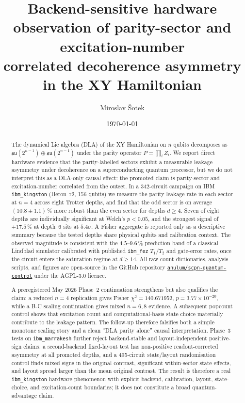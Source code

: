\documentclass[reprint,aps,physrev,superscriptaddress,floatfix,longbibliography]{revtex4-2}
\begin{document}
\title{Backend-sensitive hardware observation of parity-sector and excitation-number\\
correlated decoherence asymmetry in the XY Hamiltonian}

\author{Miroslav \v{S}otek}

\date{\today}

\begin{abstract}
The dynamical Lie algebra (DLA) of the XY Hamiltonian on $n$ qubits
decomposes as $\mathfrak{su}(2^{n-1}) \oplus \mathfrak{su}(2^{n-1})$
under the parity operator $P = \prod_i Z_i$. We report direct
hardware evidence that the parity-labelled sectors exhibit a
measurable leakage asymmetry under decoherence on a superconducting
quantum processor, but we do not interpret this as a DLA-only causal
effect: the promoted claim is parity-sector and excitation-number
correlated from the outset. In a 342-circuit campaign on IBM
\texttt{ibm\_kingston}
(Heron~r2, 156 qubits) we measure the parity leakage rate in each
sector at $n = 4$ across eight Trotter depths, and find that the odd
sector is on average $(10.8 \pm 1.1)\,\%$ more robust than the even
sector for depths $d \ge 4$. Seven of eight depths are individually
significant at Welch's $p < 0.05$, and the strongest signal of
$+17.5\,\%$ at depth~6 sits at $5.4\sigma$. A Fisher aggregate is
reported only as a descriptive summary because the tested depths share
physical qubits and calibration context. The observed magnitude is consistent
with the $4.5$--$9.6\,\%$ prediction band of a classical Lindblad
simulator calibrated with published \texttt{ibm\_fez} $T_1/T_2$ and
gate-error rates, once the circuit enters the saturation regime at
$d \ge 14$. All raw count dictionaries, analysis scripts, and figures
are open-source in the GitHub repository
\href{https://github.com/anulum/scpn-quantum-control}{\texttt{anulum/scpn-quantum-control}}
under the AGPL-3.0 licence.

A preregistered May 2026 Phase~2 continuation strengthens but also
qualifies the claim: a reduced $n=4$ replication gives Fisher
$\chi^2=140.671952$, $p=3.77\times10^{-20}$, while a B-C scaling
continuation gives mixed $n=6,8$ evidence. A subsequent popcount
control shows that excitation count and computational-basis state
choice materially contribute to the leakage pattern. The follow-up
therefore falsifies both a simple monotone scaling story and a clean
``DLA parity alone'' causal interpretation. Phase~3 tests on
\texttt{ibm\_marrakesh} further reject backend-stable and
layout-independent positive-sign claims: a second-backend fixed-layout
test has non-positive readout-corrected asymmetry at all promoted
depths, and a 495-circuit state/layout randomisation control finds
mixed signs in the original contrast, significant within-sector state
effects, and layout spread larger than the mean original contrast. The
result is therefore a real \texttt{ibm\_kingston} hardware phenomenon
with explicit backend, calibration, layout, state-choice, and
excitation-count boundaries; it does not constitute a broad
quantum-advantage claim.
\end{abstract}
\end{document}
